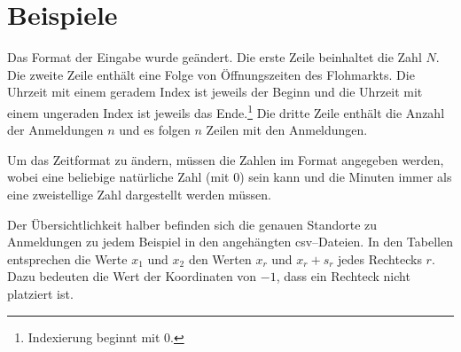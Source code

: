 \newpage
\section{Beispiele}
Das Format der Eingabe wurde geändert. 
Die erste Zeile beinhaltet die Zahl $N$.
Die zweite Zeile enthält eine Folge von Öffnungszeiten des Flohmarkts.
Die Uhrzeit mit einem geradem Index ist jeweils der Beginn und die Uhrzeit 
mit einem ungeraden Index ist jeweils das Ende.\footnote{Indexierung beginnt mit 0.}
Die dritte Zeile enthält die Anzahl der Anmeldungen $n$ und es folgen $n$ Zeilen mit den Anmeldungen.

Um das Zeitformat zu ändern, müssen die Zahlen im Format  angegeben werden, wobei
 eine beliebige natürliche Zahl (mit 0) sein kann und
die Minuten  immer als eine zweistellige Zahl dargestellt werden müssen.

Der Übersichtlichkeit halber befinden sich die genauen Standorte zu Anmeldungen
zu jedem Beispiel in den angehängten csv--Dateien.
In den Tabellen entsprechen die Werte $x_1$ und $x_2$ den Werten 
$x_r$ und $x_r + s_r$ jedes Rechtecks $r$.
Dazu bedeuten die Wert der Koordinaten von $-1$, dass ein Rechteck nicht platziert ist.











